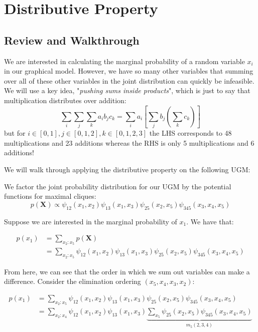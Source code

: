 \documentclass{harvardml}
\theoremstyle{definition}
\theoremstyle{plain}
\theoremstyle{definition}
\theoremstyle{remark}
\begin{document}
\section{Distributive Property}
\subsection{Review and Walkthrough}
We are interested in calculating the marginal probability of a random variable $x_i$ in our graphical model. However, we have so many other variables that summing over all of these other variables in the joint distribution can quickly be infeasible. We will use a key idea, "\emph{pushing sums inside products}", which is just to say that multiplication distributes over addition:
$$\sum_i\sum_j\sum_k a_i b_j c_k =\sum_i a_i\left[\sum_j b_j \left(\sum_k c_k\right)\right]$$
but for $i\in [0,1], j \in [0,1,2], k \in [0,1,2,3]$ the LHS corresponds to 48 multiplications and 23 additions whereas the RHS is only 5 multiplications and 6 additions!

\medskip 
We will walk through applying the distributive property on the following UGM:


We factor the joint probability distribution for our UGM by the potential functions for maximal cliques:
$$p(\mathbf{X}) \propto \psi_{12}(x_1, x_2)
\psi_{13}(x_1, x_3)
\psi_{25}(x_2, x_5)
\psi_{345}(x_3, x_4, x_5)$$

Suppose we are interested in the marginal probability of $x_1$. We have that:

\begin{align*}
p(x_1) &= \sum_{x_2 : x_5} p(\mathbf{X})\\
&= \sum_{x_2 : x_5} \psi_{12}(x_1, x_2)
\psi_{13}(x_1, x_3)
\psi_{25}(x_2, x_5)
\psi_{345}(x_3, x_4, x_5)
\end{align*}

From here, we can see that the order in which we sum out variables can make a difference. Consider the elimination ordering $(x_5, x_4, x_3, x_2)$:

\begin{align*}
p(x_1) &= \sum_{x_2 : x_5} \psi_{12}(x_1, x_2)
\psi_{13}(x_1, x_3)
\psi_{25}(x_2, x_5)
\psi_{345}(x_3, x_4, x_5)\\
&= \sum_{x_2: x_4} \psi_{12}(x_1, x_2)
\psi_{13}(x_1, x_3)
\underbrace{
\sum_{x_5}
\psi_{25}(x_2, x_5)
\psi_{345}(x_3, x_4, x_5)}_\text{$m_5(2,3,4)$}\\
\end{align*}
\end{document}
